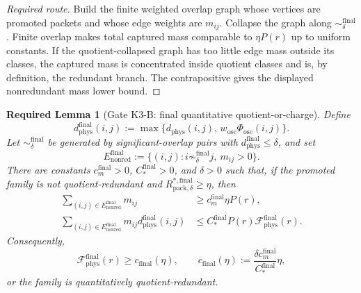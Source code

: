 \documentclass[11pt]{article}
\newtheorem{requiredlemma}{Required Lemma}
\begin{document}
\begin{proof}[Required route]
Build the finite weighted overlap graph whose vertices are promoted packets and
whose edge weights are \(m_{ij}\).  Collapse the graph along
\(\sim_\delta^{\mathrm{final}}\).  Finite overlap makes total captured mass
comparable to \(\eta P(r)\) up to uniform constants.  If the quotient-collapsed
graph has too little edge mass outside its classes, the captured mass is
concentrated inside quotient classes and is, by definition, the redundant
branch.  The contrapositive gives the displayed nonredundant mass lower bound.
\end{proof}

\begin{requiredlemma}[Gate K3-B: final quantitative quotient-or-charge]
\label{lem:K3}
Define
\begin{equation}
\label{eq:dphys-final}
d_{\mathrm{phys}}^{\mathrm{final}}(i,j)
:=
\max\{d_{\mathrm{phys}}(i,j),\,w_{\mathrm{osc}}\Phi_{\mathrm{osc}}(i,j)\}.
\end{equation}
Let \(\sim_\delta^{\mathrm{final}}\) be generated by significant-overlap pairs
with \(d_{\mathrm{phys}}^{\mathrm{final}}\le\delta\), and set
\[
E_{\mathrm{nonred}}^{\mathrm{final}}
:=\{(i,j):i\not\sim_\delta^{\mathrm{final}}j,\ m_{ij}>0\}.
\]
There are constants \(c_m^{\mathrm{final}}>0\), \(C_*^{\mathrm{final}}>0\),
and \(\delta>0\) such that, if the promoted family is not quotient-redundant
and \(R_{\mathrm{pack},\delta}^{*,\mathrm{final}}\ge\eta\), then
\begin{align}
\sum_{(i,j)\in E_{\mathrm{nonred}}^{\mathrm{final}}}m_{ij}
&\ge c_m^{\mathrm{final}}\eta P(r), \label{eq:K3-mass}\\
\sum_{(i,j)\in E_{\mathrm{nonred}}^{\mathrm{final}}}
m_{ij}d_{\mathrm{phys}}^{\mathrm{final}}(i,j)
&\le
C_*^{\mathrm{final}}P(r)\mathcal F_{\mathrm{phys}}^{\mathrm{final}}(r).
\label{eq:K3-ledger}
\end{align}
Consequently,
\begin{equation}
\label{eq:cfinal}
\mathcal F_{\mathrm{phys}}^{\mathrm{final}}(r)
\ge c_{\mathrm{final}}(\eta),
\qquad
c_{\mathrm{final}}(\eta)
:=
\frac{\delta c_m^{\mathrm{final}}}{C_*^{\mathrm{final}}}\eta,
\end{equation}
or the family is quantitatively quotient-redundant.
\end{requiredlemma}
\end{document}
